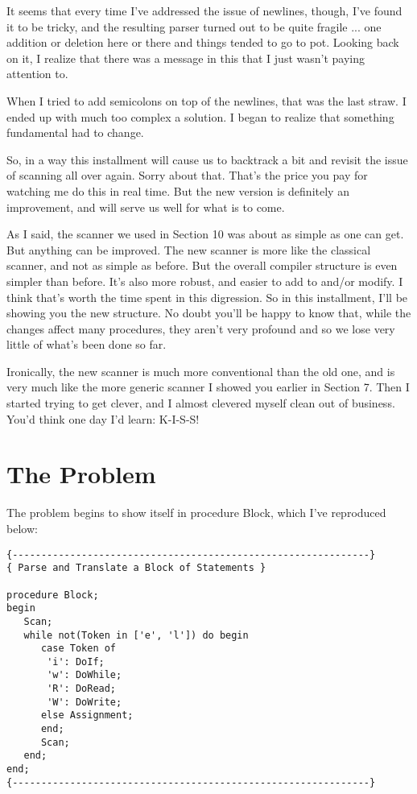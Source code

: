 It  seems  that  every time I've addressed the issue of newlines, though, I've found it to be tricky, and  the  resulting  parser turned out to be quite fragile ... one addition or  deletion here or  there and things tended to go to pot. Looking back on it, I realize that  there  was  a  message  in  this that I just wasn't paying attention to.

When I tried to add semicolons  on  top of the newlines, that was the last straw. I ended up with much too complex a solution. I began to realize that something fundamental had to change.

So, in  a  way this installment will cause us to backtrack a bit and revisit the issue of scanning all over again. Sorry  about that. That's the price you pay for watching me  do  this in real time. But the new version is definitely an improvement, and will serve us well for what is to come.

As  I said, the scanner we used in Section 10 was about as simple  as one can get. But anything can be improved. The  new scanner is more like the classical  scanner, and  not  as simple as before. But the overall  compiler  structure is even simpler than before. It's also more robust, and easier to add  to  and/or  modify. I think that's worth the time spent in this digression. So in this installment, I'll be showing  you  the  new  structure. No doubt you'll  be  happy  to  know  that, while the changes affect  many procedures, they aren't very profound  and so we lose very little of what's been done so far.

Ironically, the new scanner  is  much  more conventional than the old one, and is very much like the more generic scanner  I showed you  earlier  in  Section 7. Then I started trying to get clever, and I almost clevered myself clean out of business. You'd think one day I'd learn: K-I-S-S!

\section{The Problem}

The problem begins to show  itself in procedure Block, which I've reproduced below:

\begin{verbatim}
{--------------------------------------------------------------}
{ Parse and Translate a Block of Statements }

procedure Block;
begin
   Scan;
   while not(Token in ['e', 'l']) do begin
      case Token of
       'i': DoIf;
       'w': DoWhile;
       'R': DoRead;
       'W': DoWrite;
      else Assignment;
      end;
      Scan;
   end;
end;
{--------------------------------------------------------------}
\end{verbatim}

